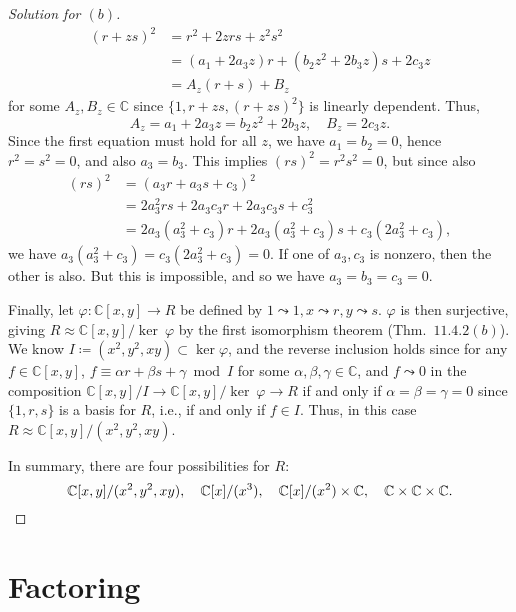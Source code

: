 \documentclass[12pt]{article}
\theoremstyle{remark}
\begin{document}
\begin{proof}[Solution for $(b)$]
  \begin{align*}
    (r+zs)^2 &= r^2 + 2zrs + z^2s^2\\
    &= (a_1+2a_3z)r + (b_2z^2+2b_3z)s + 2c_3z\\
    &= A_z(r+s) + B_z 
  \end{align*}
  for some $A_z,B_z \in \mathbb{C}$ since $\{1,r+zs,(r+zs)^2\}$ is linearly dependent. Thus,
  \begin{equation*}
    A_z = a_1+2a_3z = b_2z^2+2b_3z, \quad B_z = 2c_3z.
  \end{equation*}
  Since the first equation must hold for all $z$, we have $a_1=b_2=0$, hence $r^2=s^2=0$, and also $a_3=b_3$. This implies $(rs)^2 = r^2s^2 = 0$, but since also
  \begin{align*}
    (rs)^2 &= (a_3r+a_3s+c_3)^2\\
    &= 2a_3^2rs + 2a_3c_3r+2a_3c_3s + c_3^2\\
    &= 2a_3(a_3^2+c_3)r + 2a_3(a_3^2+c_3)s + c_3(2a_3^2+c_3),
  \end{align*}
  we have $a_3(a_3^2+c_3) = c_3(2a_3^2+c_3) = 0$. If one of $a_3,c_3$ is nonzero, then the other is also. But this is impossible, and so we have $a_3=b_3=c_3=0$. 
  \par Finally, let $\varphi\colon\mathbb{C}[x,y] \to R$ be defined by $1\leadsto1,x\leadsto r,y\leadsto s$. $\varphi$ is then surjective, giving $R \approx \mathbb{C}[x,y]/\mathord{\ker}\:\varphi$ by the first isomorphism theorem (Thm.~$11.4.2(b)$). We know $I \coloneqq (x^2,y^2,xy) \subset \ker\varphi$, and the reverse inclusion holds since for any $f \in \mathbb{C}[x,y]$, $f \equiv \alpha r + \beta s + \gamma \bmod I$ for some $\alpha,\beta,\gamma \in \mathbb{C}$, and $f \leadsto 0$ in the composition $\mathbb{C}[x,y]/I \to \mathbb{C}[x,y]/\mathord{\ker}\:\varphi \to R$ if and only if $\alpha = \beta = \gamma = 0$ since $\{1,r,s\}$ is a basis for $R$, i.e., if and only if $f \in I$. Thus, in this case $R \approx \mathbb{C}[x,y]/(x^2,y^2,xy)$.
  \par In summary, there are four possibilities for $R$:
  \begin{equation*}
    \mathbb{C}[x,y]/(x^2,y^2,xy), \quad \mathbb{C}[x]/(x^3), \quad \mathbb{C}[x]/(x^2) \times \mathbb{C}, \quad \mathbb{C} \times \mathbb{C} \times \mathbb{C}.\qedhere
  \end{equation*}
\end{proof}
\endgroup


\section{Factoring}
\end{document}
